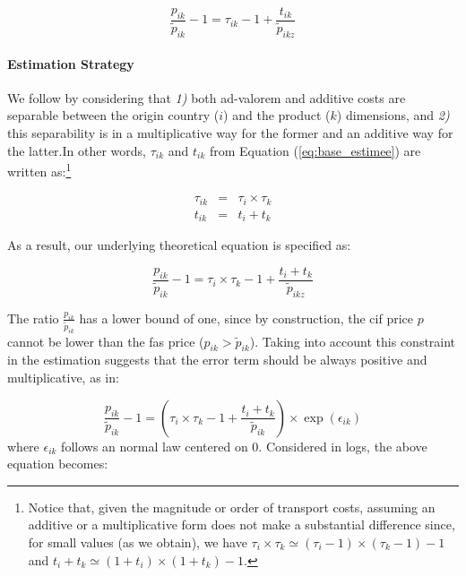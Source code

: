\documentclass[a4paper,11pt]{article}
\begin{document}
\begin{equation*}
\frac{p_{ik}}{\widetilde{p}_{ik}} -1 = \tau_{ik} -1 +\frac{t_{ik}}{ \widetilde{p}_{ikz}} \label{eq:base_estimee}
\end{equation*}

\paragraph{Estimation Strategy} We follow \citet{Irrazabal_2015} by considering that \textit{1)} both ad-valorem and additive costs are separable between the origin country ($i$) and the product ($k$) dimensions, and \textit{2)} this separability is in a multiplicative way for the former and an additive way for the latter.In other words, $\tau_{ik}$ and $t_{ik}$ from Equation (\ref{eq:base_estimee}) are written as:\footnote{Notice that, given the magnitude or order of transport costs, assuming an additive or a multiplicative form does not make a substantial difference since, for small values (as we obtain), we have $\tau_i\times \tau_k \simeq (\tau_i-1)\times (\tau_k -1)-1$ and $t_i+t_k\simeq (1+t_i)\times(1+t_k)-1$.}

\begin{eqnarray}
\tau_{ik} &=& \tau_{i} \times \tau_{k} \label{eq:ad-valorem}\\
t_{ik} &=& t_{i} + t_{k} \label{eq:add}
\end{eqnarray}

\noindent As a result, our underlying theoretical equation is specified as:

\begin{equation*}
\frac{p_{ik}}{\widetilde{p}_{ik}}-1 =\tau_{i} \times \tau_{k} -1 +\frac{t_{i} + t_{k}}{ \widetilde{p}_{ikz}} \label{eq:theory_equation}
\end{equation*}

The ratio $\frac{p_{ik}}{\widetilde{p}_{ik}}$ has a lower bound of one, since by construction, the cif price $p$ cannot be lower than the fas price ($p_{ik}>\widetilde{p}_{ik}$). Taking into account this constraint in the estimation suggests that the error term should be always positive and multiplicative, as in:

\begin{equation*}
\frac{p_{ik}}{\widetilde{p}_{ik}}-1 =\left(\tau_{i} \times \tau_{k} -1+\frac{t_{i} + t_{k}}{\widetilde{p}_{ik}} \right)\times \exp(\epsilon_{ik})
\end{equation*}
\noindent where $\epsilon_{ik}$ follows an normal law centered on 0. Considered in logs, the above equation becomes:
\end{document}
